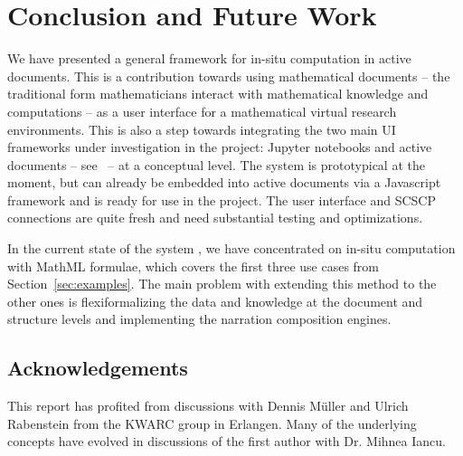 \section{Conclusion and Future Work}\label{sec:concl}
 
We have presented a general framework for in-situ computation in active documents. This is
a contribution towards using mathematical documents -- the traditional form mathematicians
interact with mathematical knowledge and computations -- as a user interface for a
mathematical virtual research environments. This is also a step towards integrating the
two main UI frameworks under investigation in the \pn project: Jupyter notebooks and
active documents -- see~ -- at a conceptual level. The system is
prototypical at the moment, but can already be embedded into active documents via a
Javascript framework and is ready for use in the \pn project. The user interface and SCSCP
connections are quite fresh and need substantial testing and optimizations.

In the current state of the system , we have concentrated on in-situ computation with
MathML formulae, which covers the first three use cases from Section~\ref{sec:examples}.
The main problem with extending this method to the other ones is flexiformalizing
the data and knowledge at the document and structure levels and implementing the narration
composition engines. 

\subsection*{Acknowledgements}
This report has profited from discussions with Dennis M\"uller and Ulrich Rabenstein from
the KWARC group in Erlangen. Many of the underlying concepts have evolved in discussions of
the first author with Dr. Mihnea Iancu.


